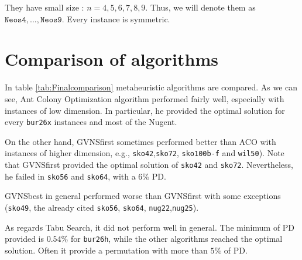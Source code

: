 They have small size : $n=4,5,6,7,8,9$. Thus, we will denote them as $\texttt{Neos4},\dots,\texttt{Neos9}$. Every instance is symmetric.

\section{Comparison of algorithms}
In table \ref{tab:Finalcomparison} metaheuristic algorithms are compared. As we can see, Ant Colony Optimization algorithm performed fairly well, especially with instances of low dimension. In particular, he provided the optimal solution for every \texttt{bur26x} instances and most of the Nugent.

On the other hand, GVNSfirst sometimes performed better than ACO with instances of higher dimension, e.g., \texttt{sko42},\texttt{sko72}, \texttt{sko100b-f} and \texttt{wil50}). Note that GVNSfirst provided the optimal solution of \texttt{sko42} and \texttt{sko72}. Nevertheless, he failed in \texttt{sko56} and \texttt{sko64}, with a $6\%$ PD.

GVNSbest in general performed worse than GVNSfirst with some exceptions (\texttt{sko49}, the already cited \texttt{sko56}, \texttt{sko64}, \texttt{nug22},\texttt{nug25}).

As regards Tabu Search, it did not perform well in general. The minimum of PD provided is $0.54\%$ for \texttt{bur26h}, while the other algorithms reached the optimal solution. Often it provide a permutation with more than $5\%$ of PD.


